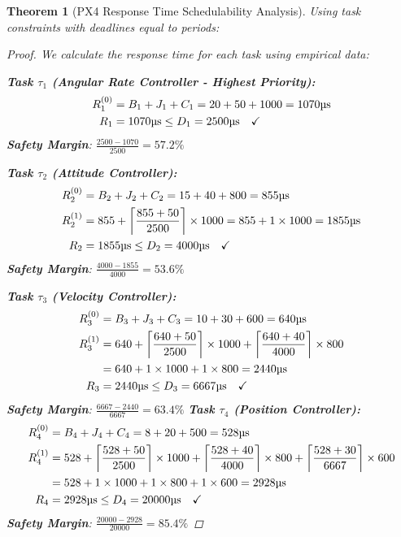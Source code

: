 \documentclass[11pt,a4paper]{article}
\newtheorem{theorem}{Theorem}[section]
\theoremstyle{definition}
\theoremstyle{remark}
\begin{document}
\begin{theorem}[PX4 Response Time Schedulability Analysis]
Using task constraints with deadlines equal to periods:

\begin{proof}
We calculate the response time for each task using empirical data:

\textbf{Task $\tau_1$ (Angular Rate Controller - Highest Priority):}
\begin{align}
R_1^{(0)} &= B_1 + J_1 + C_1 = 20 + 50 + 1000 = 1070\text{\textmu s} \\
R_1 &= 1070\text{\textmu s} \leq D_1 = 2500\text{\textmu s} \quad \checkmark
\end{align}
\textbf{Safety Margin}: $\frac{2500 - 1070}{2500} = 57.2\%$

\textbf{Task $\tau_2$ (Attitude Controller):}
\begin{align}
R_2^{(0)} &= B_2 + J_2 + C_2 = 15 + 40 + 800 = 855\text{\textmu s} \\
R_2^{(1)} &= 855 + \left\lceil \frac{855 + 50}{2500} \right\rceil \times 1000 = 855 + 1 \times 1000 = 1855\text{\textmu s} \\
R_2 &= 1855\text{\textmu s} \leq D_2 = 4000\text{\textmu s} \quad \checkmark
\end{align}
\textbf{Safety Margin}: $\frac{4000 - 1855}{4000} = 53.6\%$

\textbf{Task $\tau_3$ (Velocity Controller):}
\begin{align}
R_3^{(0)} &= B_3 + J_3 + C_3 = 10 + 30 + 600 = 640\text{\textmu s} \\
R_3^{(1)} &= 640 + \left\lceil \frac{640 + 50}{2500} \right\rceil \times 1000 + \left\lceil \frac{640 + 40}{4000} \right\rceil \times 800 \\
&= 640 + 1 \times 1000 + 1 \times 800 = 2440\text{\textmu s} \\
R_3 &= 2440\text{\textmu s} \leq D_3 = 6667\text{\textmu s} \quad \checkmark
\end{align}
\textbf{Safety Margin}: $\frac{6667 - 2440}{6667} = 63.4\%$
\textbf{Task $\tau_4$ (Position Controller):}
\begin{align}
R_4^{(0)} &= B_4 + J_4 + C_4 = 8 + 20 + 500 = 528\text{\textmu s} \\
R_4^{(1)} &= 528 + \left\lceil \frac{528 + 50}{2500} \right\rceil \times 1000 + \left\lceil \frac{528 + 40}{4000} \right\rceil \times 800 + \left\lceil \frac{528 + 30}{6667} \right\rceil \times 600 \\
&= 528 + 1 \times 1000 + 1 \times 800 + 1 \times 600 = 2928\text{\textmu s} \\
R_4 &= 2928\text{\textmu s} \leq D_4 = 20000\text{\textmu s} \quad \checkmark
\end{align}
\textbf{Safety Margin}: $\frac{20000 - 2928}{20000} = 85.4\%$

\end{proof}
\end{theorem}
\end{document}
